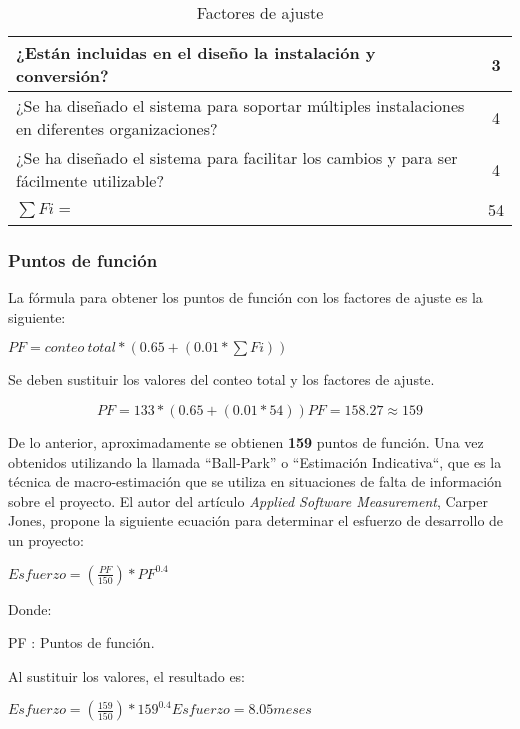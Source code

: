\begin{table}
\begin{tabular}{|p{9cm}|c|}
		¿Están incluidas en el diseño la instalación y conversión?                                                               & 3           \\ \hline
		¿Se ha diseñado el sistema para soportar múltiples instalaciones en diferentes organizaciones?                           & 4           \\ \hline
		¿Se ha diseñado el sistema para facilitar los cambios y para ser fácilmente utilizable?                                  & 4           \\ \hline
		\centering $\sum Fi=$                                                                                                  	 & 54          \\ \hline
		\end{tabular}
		\caption{Factores de ajuste}
		\label{tab:questions_adjusment}
		\end{table}


\subsubsection{Puntos de función}

La fórmula para obtener los puntos de función con los factores de ajuste es la siguiente:


\begin{center}
	$
	PF = conteo\ total *  (0.65 + (0.01 * \sum Fi))
	$


	Se deben sustituir los valores del conteo total y los factores de ajuste.


	\begin{equation}
		PF =  133 *  (0.65 + (0.01 * 54))
		PF = 158.27 \approx 159
	\end{equation}
\end{center}

De lo anterior, aproximadamente se obtienen \textbf{159} puntos de función. Una vez obtenidos utilizando la llamada “Ball-Park” o “Estimación Indicativa“, que es la técnica de macro-estimación que se utiliza en situaciones de falta de información sobre el proyecto. El autor del artículo \textit{Applied Software Measurement}\cite{abran_applied_2006}, Carper Jones, propone la siguiente ecuación para determinar el esfuerzo de desarrollo de un proyecto:


\begin{center}
	$
	Esfuerzo = (\frac{PF}{150})*PF^{0.4}
	$


	Donde:


	PF : Puntos de función.


	Al sustituir los valores, el resultado es:

	$
	Esfuerzo = (\frac{159}{150})*159^{0.4}
	Esfuerzo = 8.05 meses
	$
\end{center}


